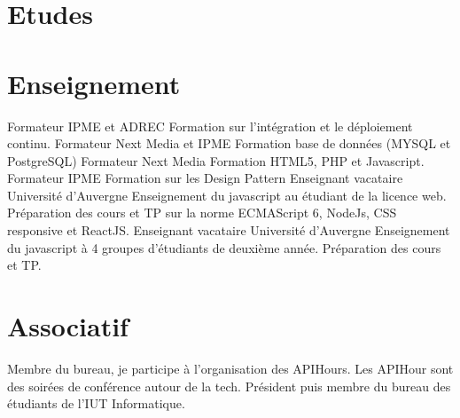 \documentclass[11pt,a4paper]{moderncv}
\begin{document}
    \section{Etudes}

    \section{Enseignement}
        {Formateur}
        {IPME et ADREC}
        {}
        {}
        {
          Formation sur l'intégration et le déploiement continu.
        }
        {Formateur}
        {Next Media et IPME}
        {}
        {}
        {
          Formation base de données (MYSQL et PostgreSQL)
        }
        {Formateur}
        {Next Media}
        {}
        {}
        {
          Formation HTML5, PHP et Javascript.
        }
        {Formateur}
        {IPME}
        {}
        {}
        {
            Formation sur les Design Pattern
        }
        {Enseignant vacataire}
        {Université d'Auvergne}
        {}
        {}
        {
          Enseignement du javascript au étudiant de la licence web.\newline{}
          Préparation des cours et TP sur la norme ECMAScript 6, NodeJs, CSS
          responsive et ReactJS.
        }
        {Enseignant vacataire}
        {Université d'Auvergne}
        {}
        {}
        {
          Enseignement du javascript à 4 groupes d'étudiants de deuxième année.\newline{}
          Préparation des cours et TP.
        }
\pagebreak
    \section{Associatif}
        {
          Membre du bureau, je participe à l'organisation des APIHours. Les
          APIHour sont \newline{}des soirées de conférence autour de la tech.
        }
        {
          Président puis membre du bureau des étudiants de l'IUT Informatique.
        }
\end{document}
